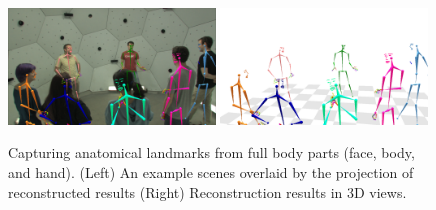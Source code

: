 \begin{figure}[h]
	\includegraphics[trim=70 0 70 70,clip,width=0.49\textwidth]{figures/fullmocap/frm_10029}
	\includegraphics[trim=70 0 70 70,clip,width=0.49\textwidth]{figures/fullmocap/frm_10029-2}	
	\caption{Capturing anatomical landmarks from full body parts (face, body, and hand). (Left) An example scenes overlaid by the projection of reconstructed results (Right) Reconstruction results in 3D views. }
	\label{fig:qualitativeFullMocap}
\end{figure}




%

\pagebreak